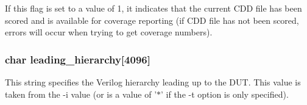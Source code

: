 If this flag is set to a value of 1, it indicates that the current CDD file has been scored and is available for coverage reporting (if CDD file has not been scored, errors will occur when trying to get coverage numbers). 
\subsubsection{\setlength{\rightskip}{0pt plus 5cm}char {\bf leading\_\-hierarchy}[4096]}\label{info_8c_a1}


This string specifies the Verilog hierarchy leading up to the DUT. This value is taken from the -i value (or is a value of '$\ast$' if the -t option is only specified). 